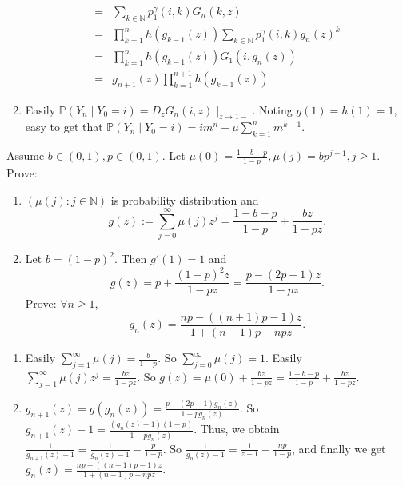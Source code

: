 \documentclass{ctexart}
\begin{document}
\begin{solution}
\begin{enumerate}
\[\begin{aligned}
          = & \sum_{k \in \mathbb{N}}p_1^\gamma(i,k)G_n(k,z)                                                    \\
          = & \prod_{k=1}^{n} h(g_{k-1} (z))\sum_{k \in \mathbb{N}}p_1^\gamma(i,k) g_n(z)^k                     \\
          = & \prod_{k=1}^{n} h(g_{k-1} (z)) G_1(i,g_n(z))                                                      \\
          = & g_{n+1}(z)\prod_{k=1}^{n + 1} h(g_{k-1} (z))
        \end{aligned}
      \]
    \item Easily \(\mathbb{P}(Y_n \mid Y_0=i)=D_z G_{n}(i,z) \mid_{z \to 1-}\).
      Noting \(g(1)=h(1)=1\), easy to get that \(\mathbb{P}(Y_n \mid Y_0=i)=im^n + \mu \sum_{k=1}^{n} m^{k-1}\).
  \end{enumerate}

\end{solution}

\begin{problem}\label{pro:2}
  Assume \(b \in (0,1), p \in (0,1)\). Let \(\mu(0)=\frac{1-b-p}{1-p},\mu(j)=bp^{j-1},j \geq 1\).
  Prove:
  \begin{enumerate}
    \item   \((\mu(j):j \in \mathbb{N})\) is probability distribution and \[
        g(z):=\sum_{j=0}^{\infty} \mu(j)z^j=\frac{1-b-p}{1-p} + \frac{bz}{1-pz}.
      \]

    \item Let \(b =(1-p)^2\).
      Then  \(g'(1)=1\) and \[
        g(z)=p + \frac{(1-p)^2 z}{1-pz}=\frac{p-(2p-1)z}{1-pz}.
      \]
      Prove:
      \(\forall n \geq 1\), \[
        g_n(z)=\frac{np-((n + 1)p-1)z}{1 + (n-1)p-npz}.
      \]
  \end{enumerate}
\end{problem}
\begin{solution}
  \begin{enumerate}
    \item Easily \(\sum_{j=1}^{\infty} \mu(j)=\frac{b}{1-p}\).
      So \(\sum_{j=0}^{\infty} \mu(j)=1\).
      Easily \(\sum_{j=1}^{\infty} \mu(j)z^j=\frac{bz}{1-pz}\).
      So \(g(z)=\mu(0)+\frac{bz}{1-pz}=\frac{1-b-p}{1-p} + \frac{bz}{1-pz}\).
    \item \(g_{n+1}(z)=g(g_n(z))=\frac{p-(2p-1)g_n(z)}{1-pg_n(z)}\).
      So \(g_{n+1}(z)-1=\frac{(g_n(z)-1)(1-p)}{1-p g_n(z)}\).
      Thus, we obtain \(\frac{1}{g_{n+1}(z)-1}=\frac{1}{g_n(z)-1}-\frac{p}{1-p}\).
      So \(\frac{1}{g_n(z)-1}=\frac{1}{z-1}-\frac{np}{1-p}\), and finally we get
      \( g_n(z)=\frac{np-((n + 1)p-1)z}{1 + (n-1)p-npz} \).
  \end{enumerate}

\end{solution}
\end{document}
